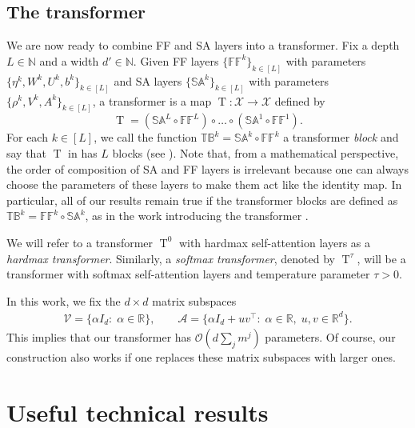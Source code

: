 \documentclass[pdflatex,sn-mathphys-num]{sn-jnl}%
\theoremstyle{thmstyleone}%
\theoremstyle{thmstyletwo}%
\theoremstyle{thmstylethree}%
\numberwithin{equation}{section}
\newcommand{\R}{\mathbb{R}}
\newcommand{\N}{\mathbb{N}}
\DeclareMathOperator{\T}{\mathrm{T}}
\begin{document}
\subsection{The transformer}\label{ss:theTransformer}
We are now ready to combine FF and SA layers into a transformer. Fix a depth $L\in \N$ and a width $d'\in \N$. Given FF layers $\{ \mathbb{FF}^k \}_{k\in [L]}$ with parameters $\{ \eta^k, W^k, U^k, b^k\}_{k\in [L]}$ and SA layers $\{\mathbb{SA}^k \}_{k\in [L]}$ with parameters $\{ \rho^k, V^k, A^k \}_{k\in [L]}$, a transformer is a map $\T : \mathcal{X} \to \mathcal{X}$ defined by
\begin{equation}\label{eq:tf-model}
\T = \left( \mathbb{SA}^L \circ \mathbb{FF}^L \right) \circ \dots \circ \left(\mathbb{SA}^1 \circ \mathbb{FF}^1 \right).
\end{equation}
For each $k\in [L]$, we call the function $\mathbb{TB}^k = \mathbb{SA}^k \circ \mathbb{FF}^k$ a transformer \textit{block} and say that $\T$ in  has $L$ blocks (see ). 
Note that, from a mathematical perspective, the order of composition of SA and FF layers is irrelevant because one can always choose the parameters of these layers to make them act like the identity map. In particular, all of our results remain true if the transformer blocks are defined as $\mathbb{TB}^k = \mathbb{FF}^k \circ \mathbb{SA}^k$, as in the work introducing the transformer \cite{vaswaniAttentionAllYou2017}.

We will refer to a transformer $\T^0$ with hardmax self-attention layers as a \textit{hardmax transformer}. Similarly, a \textit{softmax transformer}, denoted by $\T^\tau$, will be a transformer with softmax self-attention layers and temperature parameter $\tau > 0$.

In this work, we fix the $d\times d$ matrix subspaces 
\begin{align*}
    \mathcal{V} = \{\alpha I_d: \; \alpha \in \R \}, \qquad  \mathcal{A} = \{\alpha I_d + uv^\top: \; \alpha \in \R,\; u, v \in \R^d\}. 
\end{align*}
This implies that our transformer has $\mathcal{O}(d \sum_j m^j)$ parameters. Of course, our construction also works if one replaces these matrix subspaces with larger ones.

\section{Useful technical results}\label{sec:technicalResults}
\end{document}
